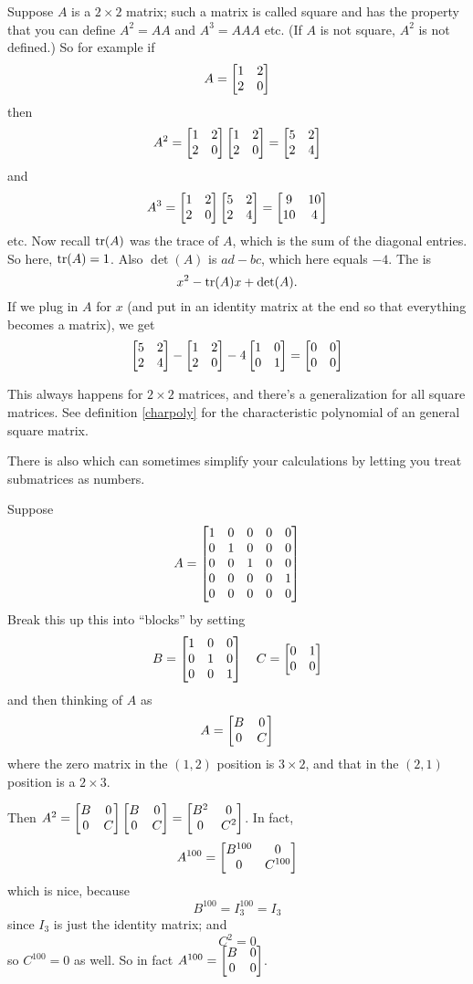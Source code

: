   
Suppose $A$ is a $2\times 2$ matrix; such a 
matrix is called square and has the property that you can define $A^2=AA$
and $A^3 = AAA$ etc. (If $A$ is not square, $A^2$ is not defined.)
So for example if 
$$
A = \left[ \begin{matrix} 1 & 2 \\ 2&0 \end{matrix} \right]
$$
then 
$$A^2 =  \left[ \begin{matrix} 1 & 2 \\ 2&0 \end{matrix} \right] \left[ \begin{matrix} 1 & 2 \\ 2&0 \end{matrix} \right] = \left[ \begin{matrix} 5&2\\2&4 \end{matrix} \right]
$$
and
$$
A^3 = \left[ \begin{matrix} 1 & 2 \\ 2&0 \end{matrix} \right]\left[ \begin{matrix} 5&2\\2&4 \end{matrix} \right] = \left[ \begin{matrix} 9&10\\10&4 \end{matrix} \right]
$$
etc.  
Now recall $\operatorname{tr}(A)$ was the trace of $A$, which is the sum of
the diagonal entries.  So here, $\operatorname{tr}(A) = 1$.  Also $\det(A)$
is $ad-bc$, which here equals $-4$.  The  is
$$
x^2 - \operatorname{tr}(A)x + \det(A).
$$
If we plug in $A$ for $x$ (and put in an identity matrix at the end
so that everything becomes a matrix), we get
$$
\left[ \begin{matrix} 5&2\\2&4 \end{matrix} \right] -  \left[ \begin{matrix} 1 & 2 \\ 2&0 \end{matrix} \right] - 4\left[ \begin{matrix} 1&0\\0&1 \end{matrix} \right] = \left[ \begin{matrix} 0&0\\0&0 \end{matrix} \right]
$$
 
This always happens for $2 \times 2$ matrices, and there's a generalization for all square matrices. See definition \ref{charpoly} for the characteristic
polynomial of an general square matrix.



There is also  which can
sometimes simplify your calculations by letting you treat 
submatrices as numbers.

\begin{myexample}
Suppose 
$$
A = \left[ \begin{matrix} 1 & 0 & 0 & 0 & 0\\
0 & 1 & 0 & 0 & 0\\
0 & 0&  1 & 0 & 0\\
0 & 0 & 0 & 0 & 1\\
0 & 0 & 0 & 0 & 0 \end{matrix} \right]
$$
Break this up this into ``blocks'' by setting
$$
B = \left[ \begin{matrix} 1 & 0 & 0 \\ 0 & 1 & 0\\ 0 & 0 & 1 \end{matrix} \right]
\quad C = \left[ \begin{matrix} 0 & 1 \\ 0 & 0 \end{matrix} \right]
$$
and then thinking of $A$ as
$$
A = \left[ \begin{matrix} B&0\\0&C \end{matrix} \right]
$$
where the zero matrix in the $(1,2)$ position is $3\times 2$, and that in the $(2,1)$ position is a $2\times 3$.
\medskip

Then $A^2 = \left[ \begin{matrix} B&0\\0&C \end{matrix} \right]\left[ \begin{matrix} B&0\\0&C \end{matrix} \right]=\left[ \begin{matrix} B^2&0\\0&C^2 \end{matrix} \right]$.
In fact,
$$
A^{100} = \left[ \begin{matrix} B^{100} & 0 \\ 0& C^{100} \end{matrix} \right]
$$
which is nice, because 
$$
B^{100} = I_3^{100} = I_3
$$
since $I_3$ is just the identity matrix; and 
$$
C^2 = 0
$$
so $C^{100} = 0$ as well.
So in fact $A^{100} = \left[ \begin{matrix} B&0\\0&0 \end{matrix} \right]$.
\end{myexample}



